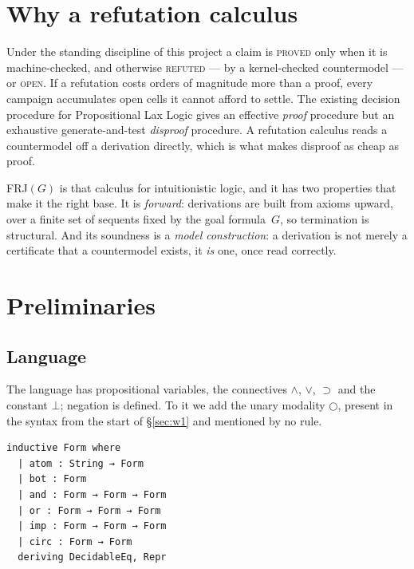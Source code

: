 \documentclass[11pt,a4paper]{article}
\begin{document}
\section{Why a refutation calculus}
\label{sec:why}

Under the standing discipline of this project a claim is \textsc{proved}
only when it is machine-checked, and otherwise \textsc{refuted} --- by a
kernel-checked countermodel --- or \textsc{open}. If a refutation costs
orders of magnitude more than a proof, every campaign accumulates open
cells it cannot afford to settle. The existing decision procedure for
Propositional Lax Logic gives an effective \emph{proof} procedure but an
exhaustive generate-and-test \emph{disproof} procedure. A refutation
calculus reads a countermodel off a derivation directly, which is what
makes disproof as cheap as proof.

FRJ$(G)$ is that calculus for intuitionistic logic, and it has two
properties that make it the right base. It is \emph{forward}: derivations
are built from axioms upward, over a finite set of sequents fixed by the
goal formula~$G$, so termination is structural. And its soundness is a
\emph{model construction}: a derivation is not merely a certificate that a
countermodel exists, it \emph{is} one, once read correctly.

\section{Preliminaries}
\label{sec:prelim}

\subsection{Language}

The language has propositional variables, the connectives $\land$, $\lor$,
$\supset$ and the constant $\bot$; negation is defined. To it we add the
unary modality $\bigcirc$, present in the syntax from the start of
\S\ref{sec:w1} and mentioned by no rule.

\begin{lstlisting}
inductive Form where
  | atom : String → Form
  | bot : Form
  | and : Form → Form → Form
  | or : Form → Form → Form
  | imp : Form → Form → Form
  | circ : Form → Form
  deriving DecidableEq, Repr
\end{lstlisting}
\end{document}
